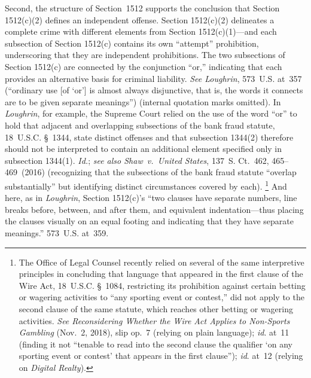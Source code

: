 Second, the structure of Section~1512 supports the conclusion that Section 1512(c)(2) defines an independent offense.
Section 1512(c)(2) delineates a complete crime with different elements from Section 1512(c)(1)---and each subsection of Section 1512(c) contains its own ``attempt'' prohibition, underscoring that they are independent prohibitions.
The two subsections of Section 1512(c) are connected by the conjunction ``or,'' indicating that each provides an alternative basis for criminal liability.
\textit{See Loughrin}, 573~U.S. at~357 (``ordinary use [of `or'] is almost always disjunctive, that is, the words it connects are to be given separate meanings'') (internal quotation marks omitted).
In \textit{Loughrin}, for example, the Supreme Court relied on the use of the word ``or'' to hold that adjacent and overlapping subsections of the bank fraud statute, 18~U.S.C. \S~1344, state distinct offenses and that subsection 1344(2) therefore should not be interpreted to contain an additional element specified only in subsection 1344(1).
\textit{Id.}; \textit{see also Shaw~v.\ United States}, 137~S. Ct.~462, 465--469~(2016) (recognizing that the subsections of the bank fraud statute ``overlap substantially'' but identifying distinct circumstances covered by each).%
\footnote{The Office of Legal Counsel recently relied on several of the same interpretive principles in concluding that language that appeared in the first clause of the Wire Act, 18~U.S.C. \S~1084, restricting its prohibition against certain betting or wagering activities to ``any sporting event or contest,'' did not apply to the second clause of the same statute, which reaches other betting or wagering activities.
\textit{See Reconsidering Whether the Wire Act Applies to Non-Sports Gambling} (Nov.~2, 2018), slip op.~7 (relying on plain language);
\textit{id}. at~11 (finding it not ``tenable to read into the second clause the qualifier `on any sporting event or contest' that appears in the first clause'');
\textit{id}. at~12 (relying on \textit{Digital Realty}).}
And here, as in \textit{Loughrin}, Section 1512(c)'s ``two clauses have separate numbers, line breaks before, between, and after them, and equivalent indentation---thus placing the clauses visually on an equal footing and indicating that they have separate meanings.'' 573~U.S. at~359.


